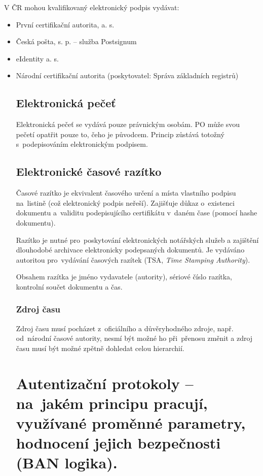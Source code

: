 V ČR mohou kvalifikovaný elektronický podpis vydávat:
\begin{itemize}
\item První certifikační autorita, a. s.
\item Česká pošta, s. p. – služba Postsignum
\item eIdentity a. s.
\item Národní certifikační autorita (poskytovatel: Správa základních registrů)


\subsection{Elektronická pečeť}

Elektronická pečeť se vydává pouze právnickým osobám.
PO může svou pečetí opatřit pouze to, čeho je původcem.
Princip zůstává totožný s~podepisováním elektronickým podpisem.


\subsection{Elektronické časové razítko}

Časové razítko je ekvivalent časového určení a místa vlastního podpisu na~listině (což elektronický podpis neřeší).
Zajišťuje důkaz o~existenci dokumentu a~validitu podepisujícího certifikátu v~daném čase (pomocí hashe dokumentu).

Razítko je nutné pro~poskytování elektronických notářských služeb a zajištění dlouhodobé archivace elektronicky podepsaných dokumentů.
Je vydáváno autoritou pro~vydávání časových razítek (TSA, \emph{Time Stamping Authority}).

Obsahem razítka je jméno vydavatele (autority), sériové číslo razítka, kontrolní součet dokumentu a čas.

\subsubsection{Zdroj času}

Zdroj času musí pocházet z~oficiálního a důvěryhodného zdroje, např. od~národní časové autority, nesmí být možné ho při~přenosu změnit a zdroj času musí být možné zpětně dohledat celou hierarchií.


\clearpage
\section{Autentizační protokoly -- na~jakém principu pracují, využívané proměnné parametry, hodnocení jejich bezpečnosti (BAN logika).}


\end{itemize}
